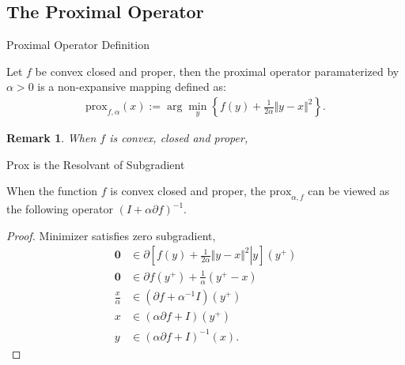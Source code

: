 \documentclass[11pt]{beamer}
\newtheorem{remark}{Remark}
\begin{document}
    \subsection{The Proximal Operator}
        \begin{frame}{Proximal Operator Definition}
            \begin{definition}
                Let $f$ be convex closed and proper, then the proximal operator paramaterized by $\alpha > 0$ is a non-expansive mapping defined as: 
                \begin{align*}
                    \text{prox}_{f, \alpha}(x) := 
                    \arg\min_{y}\left\lbrace
                        f(y) + \frac{1}{2\alpha} \Vert y - x\Vert^2
                    \right\rbrace. 
                \end{align*}
            \end{definition}  
            \begin{remark}
                When $f$ is convex, closed and proper, 
            \end{remark}
        \end{frame}
        \begin{frame}{Prox is the Resolvant of Subgradient}
            \begin{lemma}\label{lemma:prox_alternative_form}
                When the function $f$ is convex closed and proper, the $\text{prox}_{\alpha, f}$ can be viewed as the following operator $(I + \alpha \partial f)^{-1}$. 
            \end{lemma}
            \begin{proof}
                Minimizer satisfies zero subgradient, 
                {\scriptsize
                \begin{align*}
                    \mathbf 0 &\in \partial
                    \left[
                        \left.
                            f(y) + \frac{1}{2\alpha} \Vert y - x\Vert^2 
                        \right| y
                    \right](y^+)
                    \\
                    \mathbf 0 &\in \partial f(y^+) + \frac{1}{\alpha}(y^+ - x)
                    \\
                    \frac{x}{\alpha} &\in 
                    (\partial f + \alpha^{-1}I)(y^+)
                    \\
                    x &\in 
                    (\alpha \partial f + I)(y^+)
                    \\
                    y &\in (\alpha\partial f+ I)^{-1}(x).
                \end{align*}
                }
            \end{proof}
                
        \end{frame}
\end{document}
